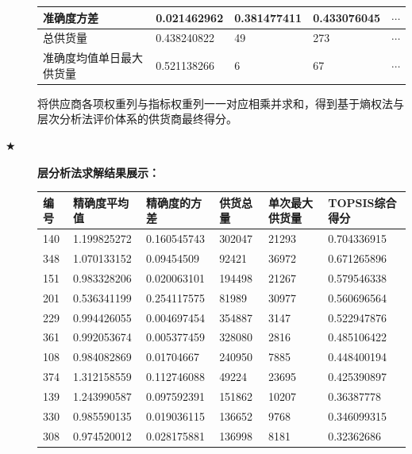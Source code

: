\documentclass[withoutpreface,bwprint]{cumcmthesis}
\begin{document}
\begin{description}
\begin{table}[htbp]
\begin{tabular}{|l|l|l|l|l|}
                \hline
                准确度方差               & 0.021462962 & 0.381477411 & 0.433076045 & $\cdots$ \\
                \hline
                总供货量                 & 0.438240822 & 49          & 273         & $\cdots$ \\
                \hline
                准确度均值单日最大供货量 & 0.521138266 & 6           & 67          & $\cdots$ \\
                \hline
            \end{tabular}
        \end{table}
        将供应商各项权重列与指标权重列一一对应相乘并求和，得到基于熵权法与层次分析法评价体系的供货商最终得分。

    \item[$\bigstar$] \textbf{层分析法求解结果展示：}
        \begin{longtable}{l|llll|l}
            \toprule
            编号 & 精确度平均值 & 精确度的方差 & 供货总量 & 单次最大供货量 & TOPSIS综合得分 \\
            \midrule
            140  & 1.199825272  & 0.160545743  & 302047   & 21293          & 0.704336915    \\
            348  & 1.070133152  & 0.09454509   & 92421    & 36972          & 0.671265896    \\
            151  & 0.983328206  & 0.020063101  & 194498   & 21267          & 0.579546338    \\
            201  & 0.536341199  & 0.254117575  & 81989    & 30977          & 0.560696564    \\
            229  & 0.994426055  & 0.004697454  & 354887   & 3147           & 0.522947876    \\
            361  & 0.992053674  & 0.005377459  & 328080   & 2816           & 0.485106422    \\
            108  & 0.984082869  & 0.01704667   & 240950   & 7885           & 0.448400194    \\
            374  & 1.312158559  & 0.112746088  & 49224    & 23695          & 0.425390897    \\
            139  & 1.243990587  & 0.097592391  & 151862   & 10207          & 0.36387778     \\
            330  & 0.985590135  & 0.019036115  & 136652   & 9768           & 0.346099315    \\
            308  & 0.974520012  & 0.028175881  & 136998   & 8181           & 0.32362686     \\

\end{longtable}
\end{description}
\end{document}
